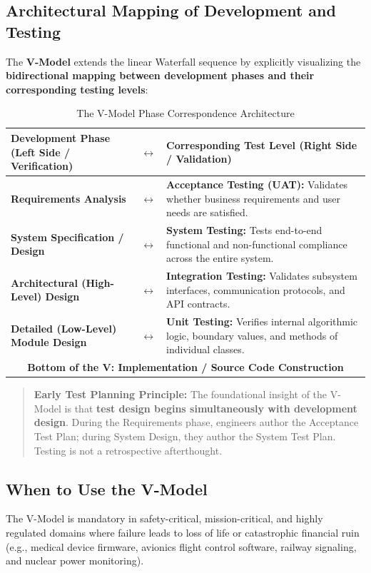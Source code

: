 \subsection{Architectural Mapping of Development and Testing}
The \textbf{V-Model} extends the linear Waterfall sequence by explicitly visualizing the \textbf{bidirectional mapping between development phases and their corresponding testing levels}:
\begin{table}[htbp]
\centering
\small
\caption{The V-Model Phase Correspondence Architecture}
\label{tab:v_model_mapping}
\begin{tabularx}{\textwidth}{p{4.8cm} c X}
\toprule
\textbf{Development Phase (Left Side / Verification)} & $\longleftrightarrow$ & \textbf{Corresponding Test Level (Right Side / Validation)} \\
\midrule
\textbf{Requirements Analysis} & $\longleftrightarrow$ & \textbf{Acceptance Testing (UAT):} Validates whether business requirements and user needs are satisfied. \\
\textbf{System Specification / Design} & $\longleftrightarrow$ & \textbf{System Testing:} Tests end-to-end functional and non-functional compliance across the entire system. \\
\textbf{Architectural (High-Level) Design} & $\longleftrightarrow$ & \textbf{Integration Testing:} Validates subsystem interfaces, communication protocols, and API contracts. \\
\textbf{Detailed (Low-Level) Module Design} & $\longleftrightarrow$ & \textbf{Unit Testing:} Verifies internal algorithmic logic, boundary values, and methods of individual classes. \\
\multicolumn{3}{c}{\textbf{Bottom of the V: Implementation / Source Code Construction}} \\
\bottomrule
\end{tabularx}
\end{table}

\begin{quote}
\textbf{Early Test Planning Principle:} The foundational insight of the V-Model is that \textbf{test design begins simultaneously with development design}. During the Requirements phase, engineers author the Acceptance Test Plan; during System Design, they author the System Test Plan. Testing is not a retrospective afterthought.
\end{quote}

\subsection{When to Use the V-Model}
The V-Model is mandatory in safety-critical, mission-critical, and highly regulated domains where failure leads to loss of life or catastrophic financial ruin (e.g., medical device firmware, avionics flight control software, railway signaling, and nuclear power monitoring).

